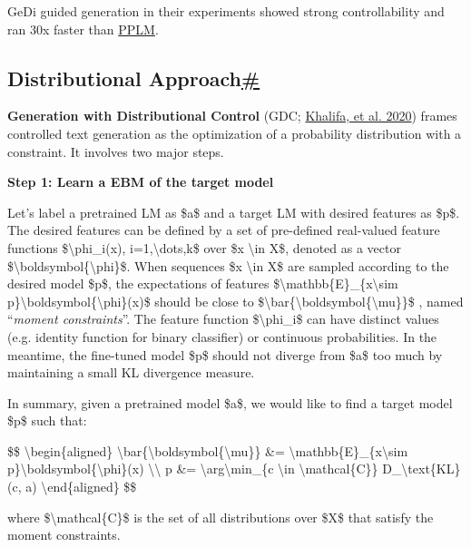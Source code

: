 GeDi guided generation in their experiments showed strong controllability and ran 30x faster than \hyperref[pplm]{PPLM}.

\subsection{\texorpdfstring{Distributional Approach\hyperref[distributional-approach]{\#}}{Distributional Approach\#}}\label{distributional-approach}

\textbf{Generation with Distributional Control} (GDC; \href{https://arxiv.org/abs/2012.11635}{Khalifa, et al. 2020}) frames controlled text generation as the optimization of a probability distribution with a constraint. It involves two major steps.

\textbf{Step 1: Learn a EBM of the target model}

Let's label a pretrained LM as \$a\$ and a target LM with desired features as \$p\$. The desired features can be defined by a set of pre-defined real-valued feature functions \$\textbackslash phi\_i(x), i=1,\textbackslash dots,k\$ over \$x \textbackslash in X\$, denoted as a vector \$\textbackslash boldsymbol\{\textbackslash phi\}\$. When sequences \$x \textbackslash in X\$ are sampled according to the desired model \$p\$, the expectations of features \$\textbackslash mathbb\{E\}\_\{x\textbackslash sim p\}\textbackslash boldsymbol\{\textbackslash phi\}(x)\$ should be close to \$\textbackslash bar\{\textbackslash boldsymbol\{\textbackslash mu\}\}\$ , named ``\emph{moment constraints}''. The feature function \$\textbackslash phi\_i\$ can have distinct values (e.g. identity function for binary classifier) or continuous probabilities. In the meantime, the fine-tuned model \$p\$ should not diverge from \$a\$ too much by maintaining a small KL divergence measure.

In summary, given a pretrained model \$a\$, we would like to find a target model \$p\$ such that:

\$\$ \textbackslash begin\{aligned\} \textbackslash bar\{\textbackslash boldsymbol\{\textbackslash mu\}\} \&= \textbackslash mathbb\{E\}\_\{x\textbackslash sim p\}\textbackslash boldsymbol\{\textbackslash phi\}(x) \textbackslash\textbackslash{} p \&= \textbackslash arg\textbackslash min\_\{c \textbackslash in \textbackslash mathcal\{C\}\} D\_\textbackslash text\{KL\}(c, a) \textbackslash end\{aligned\} \$\$

where \$\textbackslash mathcal\{C\}\$ is the set of all distributions over \$X\$ that satisfy the moment constraints.

